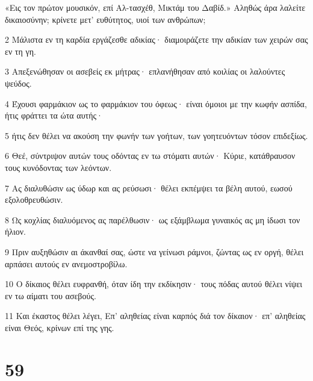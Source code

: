 \par «Εις τον πρώτον μουσικόν, επί Αλ-τασχέθ, Μικτάμ του Δαβίδ.» Αληθώς άρα λαλείτε δικαιοσύνην; κρίνετε μετ' ευθύτητος, υιοί των ανθρώπων;
\par 2 Μάλιστα εν τη καρδία εργάζεσθε αδικίας· διαμοιράζετε την αδικίαν των χειρών σας εν τη γη.
\par 3 Απεξενώθησαν οι ασεβείς εκ μήτρας· επλανήθησαν από κοιλίας οι λαλούντες ψεύδος.
\par 4 Έχουσι φαρμάκιον ως το φαρμάκιον του όφεως· είναι όμοιοι με την κωφήν ασπίδα, ήτις φράττει τα ώτα αυτής·
\par 5 ήτις δεν θέλει να ακούση την φωνήν των γοήτων, των γοητευόντων τόσον επιδεξίως.
\par 6 Θεέ, σύντριψον αυτών τους οδόντας εν τω στόματι αυτών· Κύριε, κατάθραυσον τους κυνόδοντας των λεόντων.
\par 7 Ας διαλυθώσιν ως ύδωρ και ας ρεύσωσι· θέλει εκπέμψει τα βέλη αυτού, εωσού εξολοθρευθώσιν.
\par 8 Ως κοχλίας διαλυόμενος ας παρέλθωσιν· ως εξάμβλωμα γυναικός ας μη ίδωσι τον ήλιον.
\par 9 Πριν αυξηθώσιν αι άκανθαί σας, ώστε να γείνωσι ράμνοι, ζώντας ως εν οργή, θέλει αρπάσει αυτούς εν ανεμοστροβίλω.
\par 10 Ο δίκαιος θέλει ευφρανθή, όταν ίδη την εκδίκησιν· τους πόδας αυτού θέλει νίψει εν τω αίματι του ασεβούς.
\par 11 Και έκαστος θέλει λέγει, Επ' αληθείας είναι καρπός διά τον δίκαιον· επ' αληθείας είναι Θεός, κρίνων επί της γης.

\chapter{59}

